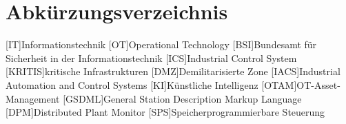 \section*{Abkürzungsverzeichnis}
\begin{acronym}
  [IT]{Informationstechnik}
  [OT]{Operational Technology}
  [BSI]{Bundesamt für Sicherheit in der Informationstechnik}
  [ICS]{Industrial Control System}
  [KRITIS]{kritische Infrastrukturen}
  [DMZ]{Demilitarisierte Zone}
  [IACS]{Industrial Automation and Control Systems}
  [KI]{Künstliche Intelligenz}
  [OTAM]{OT-Asset-Management}
  [GSDML]{General Station Description Markup Language}
  [DPM]{Distributed Plant Monitor}
  [SPS]{Speicherprogrammierbare Steuerung}
\end{acronym}
\newpage


